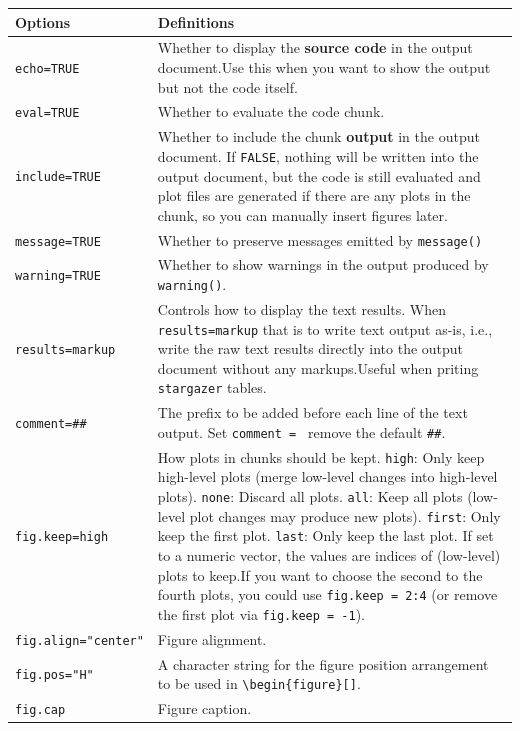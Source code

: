 \documentclass[
]{book}
\theoremstyle{definition}
\theoremstyle{definition}
\theoremstyle{definition}
\theoremstyle{definition}
\theoremstyle{remark}
\begin{document}
\begin{longtable}[]{@{}
  >{\raggedright\arraybackslash}p{}
  >{\raggedright\arraybackslash}p{}@{}}
\toprule\noalign{}
\begin{minipage}[b]{\linewidth}\raggedright
Options
\end{minipage} & \begin{minipage}[b]{\linewidth}\raggedright
Definitions
\end{minipage} \\
\midrule\noalign{}
\endhead
\bottomrule\noalign{}
\endlastfoot
\texttt{echo=TRUE} & Whether to display the \textbf{source code} in the output document.Use this when you want to show the output but not the code itself. \\
\texttt{eval=TRUE} & Whether to evaluate the code chunk. \\
\texttt{include=TRUE} & Whether to include the {chunk \textbf{output}} in the output document. If \texttt{FALSE}, nothing will be written into the output document, but the code is still evaluated and plot files are generated if there are any plots in the chunk, so you can manually insert figures later. \\
\texttt{message=TRUE} & Whether to preserve messages emitted by \texttt{message()} \\
\texttt{warning=TRUE} & Whether to show warnings in the output produced by \texttt{warning()}. \\
\texttt{results=\textquotesingle{}markup\textquotesingle{}} & Controls how to display the text results. When \texttt{results=\textquotesingle{}markup\textquotesingle{}} that is to write text output as-is, i.e., write the raw text results directly into the output document without any markups.Useful when priting \texttt{stargazer} tables. \\
\texttt{comment=\textquotesingle{}\#\#\textquotesingle{}} & The prefix to be added before each line of the text output. Set \texttt{comment\ =\ \textquotesingle{}\textquotesingle{}} remove the default \texttt{\#\#}. \\
\texttt{fig.keep=\textquotesingle{}high\textquotesingle{}} & How plots in chunks should be kept. \texttt{high}: Only keep high-level plots (merge low-level changes into high-level plots). \texttt{none}: Discard all plots. \texttt{all}: Keep all plots (low-level plot changes may produce new plots). \texttt{first}: Only keep the first plot. \texttt{last}: Only keep the last plot. If set to a numeric vector, the values are indices of (low-level) plots to keep.If you want to choose the second to the fourth plots, you could use \texttt{fig.keep\ =\ 2:4} (or remove the first plot via \texttt{fig.keep\ =\ -1}). \\
\texttt{fig.align="center"} & Figure alignment. \\
\texttt{fig.pos="H"} & A character string for the figure position arrangement to be used in \texttt{\textbackslash{}begin\{figure\}{[}{]}}. \\
\texttt{fig.cap} & Figure caption. \\
\end{longtable}
\end{document}
